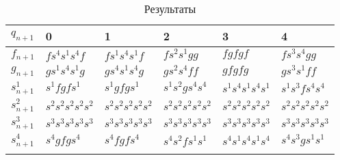 \documentclass[a4paper, 12pt]{article}
\begin{document}
\begin{center}
\begin{longtable}{| l | l | l | l | l | l |}

\hline $q_{n+1}$ & 0 & 1 & 2 & 3 & 4 \\
\hline

$f_{n+1}$ & $f s^4 s^1 s^4 f$ & $f s^1 s^4 s^1 f$ & $f s^2 s^1 g g$ & $f g f g f$ & $f s^3 s^4 g g$
\\ \hline

$g_{n+1}$ & $g s^1 s^4 s^1 g$ & $g s^4 s^1 s^4 g$ & $g s^2 s^4 f f$ & $g f g f g$ & $g s^3 s^1 f f$
\\ \hline

$s^1_{n+1}$ & $s^1 f g f s^1$ & $s^1 g f g s^1$ & $s^1 s^2 g s^4 s^4$ & $s^1 s^4 s^1 s^4 s^1$ & $s^1 s^3 f s^4 s^4$
\\ \hline

$s^2_{n+1}$ & $s^2 s^2 s^2 s^2 s^2$ & $s^2 s^2 s^2 s^2 s^2$ & $s^2 s^2 s^2 s^2 s^2$ & $s^2 s^2 s^2 s^2 s^2$ & $s^2 s^2 s^2 s^2 s^2$
\\ \hline

$s^3_{n+1}$ & $s^3 s^3 s^3 s^3 s^3$ & $s^3 s^3 s^3 s^3 s^3$ & $s^3 s^3 s^3 s^3 s^3$ & $s^3 s^3 s^3 s^3 s^3$ & $s^3 s^3 s^3 s^3 s^3$
\\ \hline

$s^4_{n+1}$ & $s^4 g f g s^4$ & $s^4 f g f s^4$ & $s^4 s^2 f s^1 s^1$ & $s^4 s^1 s^4 s^1 s^4$ & $s^4 s^3 g s^1 s^1$
\\ \hline

\caption{Результаты}
\label{functab}
\end{longtable}
\end{center}
\end{document}
